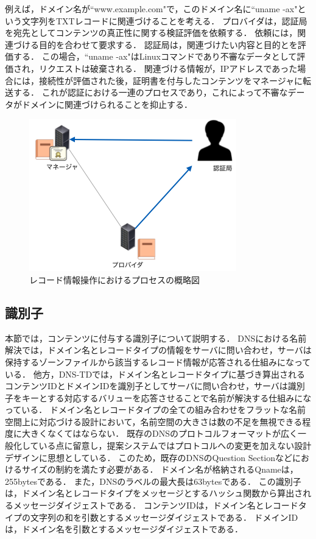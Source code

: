 例えば，ドメイン名が``www.example.com"で，このドメイン名に``uname -ax"という文字列をTXTレコードに関連づけることを考える．
プロバイダは，認証局を宛先としてコンテンツの真正性に関する検証評価を依頼する．
依頼には，関連づける目的を合わせて要求する．
認証局は，関連づけたい内容と目的とを評価する．
この場合，``uname -ax"はLinuxコマンドであり不審なデータとして評価され，リクエストは破棄される．
関連づける情報が，IPアドレスであった場合には，接続性が評価された後，証明書を付与したコンテンツをマネージャに転送する．
これが認証における一連のプロセスであり，これによって不審なデータがドメインに関連づけられることを抑止する．
\begin{figure}[h]
 \centering
 \includegraphics[scale=0.7]{figure/certificate-procedure.png}
 \caption{レコード情報操作におけるプロセスの概略図}
 \label{fig:manager-provider}
\end{figure}


\subsection{識別子}
本節では，コンテンツに付与する識別子について説明する．
DNSにおける名前解決では，ドメイン名とレコードタイプの情報をサーバに問い合わせ，サーバは保持するゾーンファイルから該当するレコード情報が応答される仕組みになっている．
他方，DNS-TDでは，ドメイン名とレコードタイプに基づき算出されるコンテンツIDとドメインIDを識別子としてサーバに問い合わせ，サーバは識別子をキーとする対応するバリューを応答させることで名前が解決する仕組みになっている．
ドメイン名とレコードタイプの全ての組み合わせをフラットな名前空間上に対応づける設計において，名前空間の大きさは数の不足を無視できる程度に大きくなくてはならない．
既存のDNSのプロトコルフォーマットが広く一般化している点に留意し，提案システムではプロトコルへの変更を加えない設計デザインに思想としている．
このため，既存のDNSのQuestion Sectionなどにおけるサイズの制約を満たす必要がある．
ドメイン名が格納されるQnameは，255bytesである．
また，DNSのラベルの最大長は63bytesである．
この識別子は，ドメイン名とレコードタイプをメッセージとするハッシュ関数から算出されるメッセージダイジェストである．
コンテンツIDは，ドメイン名とレコードタイプの文字列の和を引数とするメッセージダイジェストである．
ドメインIDは，ドメイン名を引数とするメッセージダイジェストである．

